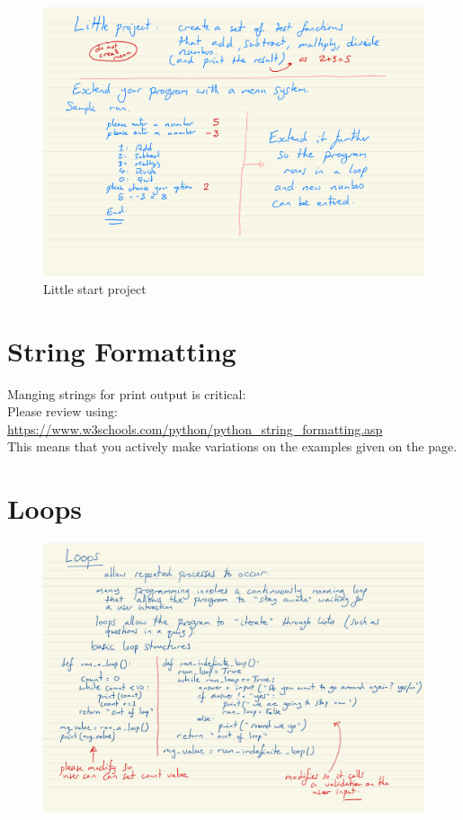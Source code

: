 \documentclass[a4paper,12pt]{article}
\begin{document}
\newpage
\begin{figure}[!ht]
	\centering
	\includegraphics[width=15cm]{little_start_project.pdf}
	\caption*{Little start project}
\end{figure}


\newpage
\section{String Formatting}
Manging strings for print output is critical:\\

Please review using:\\
\url{https://www.w3schools.com/python/python_string_formatting.asp}\\
This means that you actively make variations on the examples given on the page.
\newpage
\section{Loops} 

\begin{figure}[!ht]
	\centering
	\includegraphics[width=17cm]{loops.pdf}
\end{figure}
\end{document}
